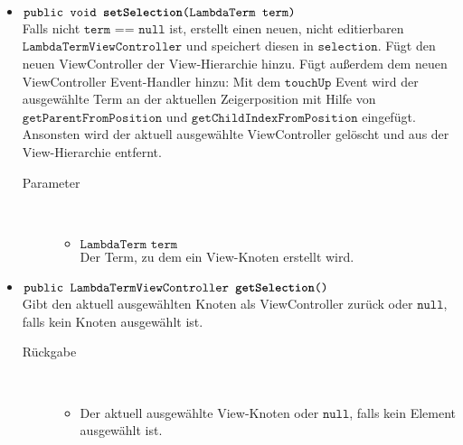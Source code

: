 \begin{description}
\begin{itemize}
		\item $\texttt{public void \textbf{setSelection}(LambdaTerm term)}$ \\ Falls nicht $\texttt{term == null}$ ist, erstellt einen neuen, nicht editierbaren $\texttt{LambdaTermViewController}$ und speichert diesen in $\texttt{selection}$. Fügt den neuen ViewController der View-Hierarchie hinzu. Fügt außerdem dem neuen ViewController Event-Handler hinzu: Mit dem $\texttt{touchUp}$ Event wird der ausgewählte Term an der aktuellen Zeigerposition mit Hilfe von $\texttt{getParentFromPosition}$ und $\texttt{getChildIndexFromPosition}$ eingefügt. Ansonsten wird der aktuell ausgewählte ViewController gelöscht und aus der View-Hierarchie entfernt.
		\begin{description}
			\item[Parameter] \hfill \\
			\vspace{-.8cm}
			\begin{itemize}
				\item $\texttt{LambdaTerm term}$ \\ Der Term, zu dem ein View-Knoten erstellt wird.
			\end{itemize}
		\end{description}
		
		\item $\texttt{public LambdaTermViewController \textbf{getSelection}()}$ \\ Gibt den aktuell ausgewählten Knoten als ViewController zurück oder $\texttt{null}$, falls kein Knoten ausgewählt ist.
		\begin{description}
			\item[Rückgabe] \hfill \\
			\vspace{-.8cm}
			\begin{itemize}
				\item Der aktuell ausgewählte View-Knoten oder $\texttt{null}$, falls kein Element ausgewählt ist.
			\end{itemize}
		\end{description}
		

\end{itemize}
\end{description}
